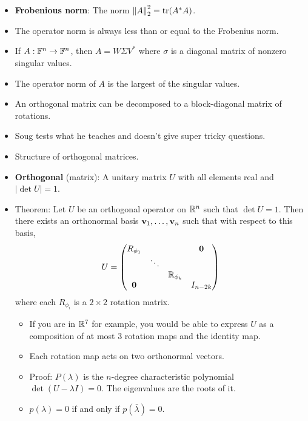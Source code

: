 \documentclass[../../notes.tex]{subfiles}
\begin{document}
\begin{itemize}
\begin{itemize}
    \end{itemize}
    \item \textbf{Frobenious norm}: The norm $\norm{A}_2^2=\trace(A^*A)$.
    \item The operator norm is always less than or equal to the Frobenius norm.
    \item If $A:\mathbb{F}^n\to\mathbb{F}^n$, then $A=W\Sigma V^*$ where $\sigma$ is a diagonal matrix of nonzero singular values.
    \item The operator norm of $A$ is the largest of the singular values.
    \item An orthogonal matrix can be decomposed to a block-diagonal matrix of rotations.
    \item {}Soug tests what he teaches and doesn't give super tricky questions.
    \item Structure of orthogonal matrices.
    \item \textbf{Orthogonal} (matrix): A unitary matrix $U$ with all elements real and $|\det U|=1$.
    \item Theorem: Let $U$ be an orthogonal operator on $\mathbb{R}^n$ such that $\det U=1$. Then there exists an orthonormal basis $\mathbf{v}_1,\dots,\mathbf{v}_n$ such that with respect to this basis,
    \begin{equation*}
        U =
        \begin{pmatrix}
            R_{\phi_1} &  &  & \bm{0}\\
             & \ddots &  & \\
             &  & \mathbb{R}_{\phi_k} & \\
            \bm{0} &  &  & I_{n-2k}\\
        \end{pmatrix}
    \end{equation*}
    where each $R_{\phi_i}$ is a $2\times 2$ rotation matrix.
    \begin{itemize}
        \item If you are in $\mathbb{R}^7$ for example, you would be able to express $U$ as a composition of at most 3 rotation maps and the identity map.
        \item Each rotation map acts on two orthonormal vectors.
        \item Proof: $P(\lambda)$ is the $n$-degree characteristic polynomial $\det(U-\lambda I)=0$. The eigenvalues are the roots of it.
        \item $p(\lambda)=0$ if and only if $p(\bar{\lambda})=0$.
        \begin{itemize}

\end{itemize}
\end{itemize}
\end{itemize}
\end{document}
